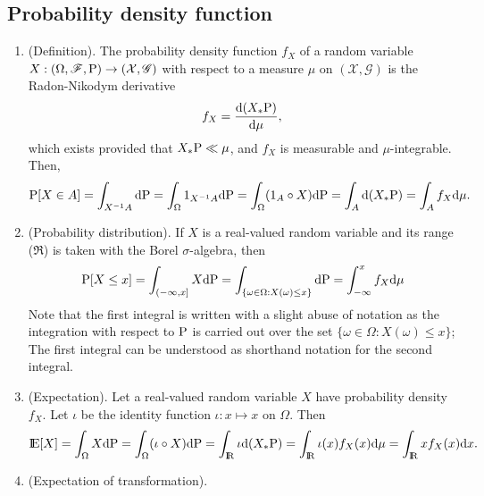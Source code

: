 \documentclass[a4paper,10pt]{article}
\begin{document}
\subsection{Probability density function}
\begin{enumerate}
 \item (Definition).
    The probability density function $f_X$ of a random variable $X:(\Omega,\mathscr{F},\mathrm{P})\to (\mathcal{X},\mathscr{G})$
    with respect to a measure $\mu$ on $(\mathcal{X},\mathscr{G})$ is the Radon-Nikodym derivative
    \[
     f_X = \frac{\mathrm{d} (X_*\mathrm{P})}{\mathrm{d} \mu},
    \]
    which exists provided that $X_*\mathrm{P} \ll \mu$, and $f_X$ is measurable and $\mu$-integrable. Then,
    \begin{align*}
     \mathrm{P}[X\in A] = \int_{X^{-1}A}\mathrm{d} \mathrm{P}
                   = \int_{\Omega} 1_{X^{-1}A}\mathrm{d}\mathrm{P}
                   = \int_{\Omega} (1_{A}\circ X)\mathrm{d}\mathrm{P}
                   = \int_{A}\mathrm{d}(X_*\mathrm{P})
                   = \int_A f_X \mathrm{d} \mu.
    \end{align*}
  \item (Probability distribution).
	If $X$ is a real-valued random variable and its range ($\Re$) is taken with the 
        Borel $\sigma$-algebra, then 
        \begin{align*}
         \mathrm{P}[X\leq x] = \int_{(-\infty, x]}X\mathrm{d} \mathrm{P}
         = \int_{\{\omega\in\Omega: X(\omega) \leq x\}}\mathrm{d} \mathrm{P}
         = \int_{-\infty}^x f_X\mathrm{d} \mu
        \end{align*}
        Note that the first integral is written with a slight abuse of notation as the 
        integration with respect to $\mathrm{P}$ is carried out over the set $\{\omega\in\Omega: X(\omega) \leq x\}$;
        The first integral can be understood as shorthand notation for the second integral.
  \item (Expectation).
	Let a real-valued random variable $X$ have probability density $f_X$. Let $\iota$
	be the identity function $\iota:x\mapsto x$ on $\Omega$. Then
        \[
         \E[X] = \int_\Omega X\d\prob 
               = \int_\Omega (\iota\circ X)\d\prob 
               = \int_\Re \iota\d(X_*\prob)
               = \int_\Re \iota(x) f_X(x) \d\mu
               = \int_\Re x f_X(x) \d x.
        \]
  \item (Expectation of transformation).
\end{enumerate}
\end{document}
